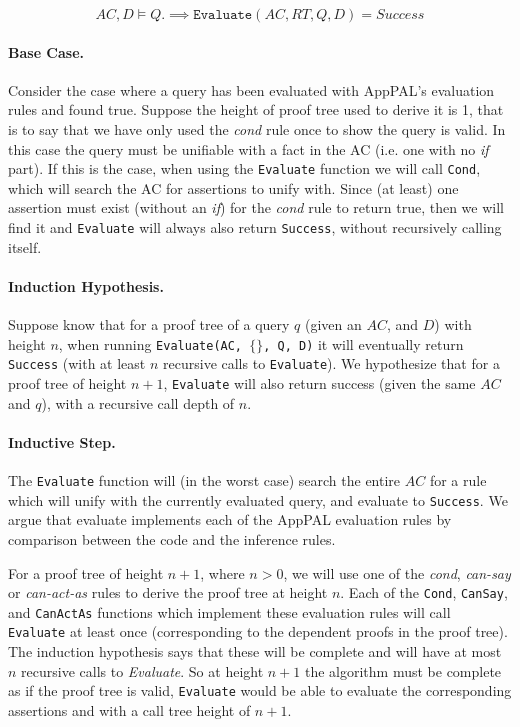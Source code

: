 \documentclass[thesis.tex]{subfiles}
\begin{document}
\begin{equation*}
  AC, D \models Q.
  \implies
  \mathtt{Evaluate}(AC, RT, Q, D) = \textit{Success} 
\end{equation*}


\paragraph*{Base Case.}  Consider the case where a query has been
evaluated with AppPAL's evaluation rules and found true. Suppose the
height of proof tree used to derive it is 1, that is to say that we
have only used the \emph{cond} rule once to show the query is
valid. In this case the query must be unifiable with a fact in the AC
(i.e. one with no \emph{if} part).  If this is the case, when using
the \texttt{Evaluate} function we will call \texttt{Cond}, which will
search the AC for assertions to unify with.  Since (at least) one
assertion must exist (without an \emph{if}) for the \emph{cond} rule
to return true, then we will find it and \texttt{Evaluate} will always
also return \texttt{Success}, without recursively calling itself.

\paragraph*{Induction Hypothesis.}  Suppose know that for a proof
tree of a query $q$ (given an $AC$, and $D$) with height $n$, when running
\texttt{Evaluate(AC, $\{\}$, Q, D)} it will eventually return
\texttt{Success} (with at least $n$ recursive calls to
\texttt{Evaluate}).  We hypothesize that for a proof tree of height
$n+1$, \texttt{Evaluate} will also return success (given the same
$AC$ and $q$), with a recursive call depth of $n$.

\paragraph*{Inductive Step.}  The \texttt{Evaluate} function will (in
the worst case) search the entire $AC$ for a rule which will unify
with the currently evaluated query, and evaluate to \texttt{Success}.
We argue that evaluate implements each of the AppPAL evaluation rules
by comparison between the code and the inference rules.

For a proof tree of height $n+1$, where $n>0$, we will use one of the
\emph{cond}, \emph{can-say} or \emph{can-act-as} rules to derive the
proof tree at height $n$.  Each of the \texttt{Cond}, \texttt{CanSay},
and \texttt{CanActAs} functions which implement these evaluation rules
will call \texttt{Evaluate} at least once (corresponding to the
dependent proofs in the proof tree).  The induction hypothesis says
that these will be complete and will have at most $n$ recursive
calls to \emph{Evaluate}.  So at height $n+1$ the algorithm must be
complete as if the proof tree is valid, \texttt{Evaluate} would be
able to evaluate the corresponding assertions and with a call tree
height of $n+1$.
\end{document}
